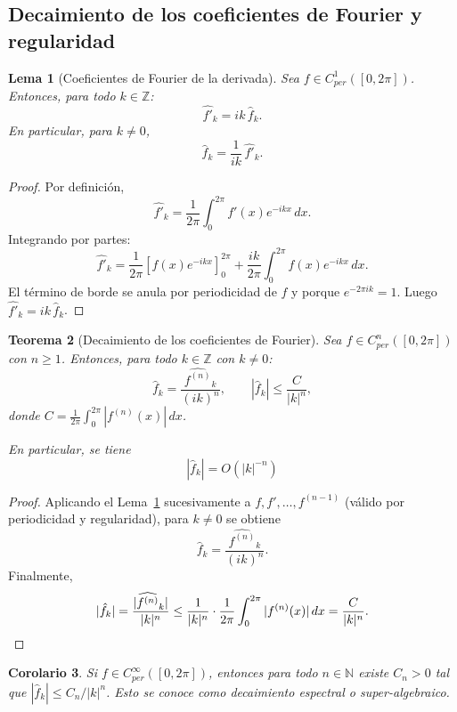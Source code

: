 \documentclass[a4paper,11pt]{report}
\newtheorem{theorem}{Teorema}[chapter]
\newtheorem{lemma}[theorem]{Lema}
\newtheorem{corollary}[theorem]{Corolario}
\begin{document}
\subsection{Decaimiento de los coeficientes de Fourier y regularidad}

\begin{lemma}[Coeficientes de Fourier de la derivada]\label{lem:fourier_derivada_coef}
Sea $f\in C^1_{per}([0,2\pi])$. Entonces, para todo $k\in\mathbb Z$:
\[
\widehat{f'}_k = ik\,\hat f_k.
\]
En particular, para $k\neq 0$,
\begin{equation}\label{fourier_deriv}
\hat f_k = \frac{1}{ik}\,\widehat{f'}_k.
\end{equation}
\end{lemma}

\begin{proof}
Por definición,
\[
\widehat{f'}_k=\frac{1}{2\pi}\int_0^{2\pi}f'(x)e^{-ikx}\,dx.
\]
Integrando por partes:
\[
\widehat{f'}_k
=\frac{1}{2\pi}\left[f(x)e^{-ikx}\right]_0^{2\pi}
+\frac{ik}{2\pi}\int_0^{2\pi}f(x)e^{-ikx}\,dx.
\]
El término de borde se anula por periodicidad de $f$ y porque $e^{-2\pi ik}=1$. Luego
$\widehat{f'}_k=ik\,\hat f_k$.
\end{proof}

\begin{theorem}[Decaimiento de los coeficientes de Fourier]\label{thm:decaimiento_fourier}
Sea $f \in C^n_{per}([0,2\pi])$ con $n \ge 1$. Entonces, para todo $k \in \mathbb{Z}$ con $k \neq 0$:
\[
\hat{f}_k = \frac{\widehat{f^{(n)}}_k}{(ik)^n}, \qquad |\hat{f}_k| \leq \frac{C}{|k|^n},
\]
donde $C = \frac{1}{2\pi}\int_0^{2\pi}|f^{(n)}(x)|\,dx$.

En particular, se tiene 
\[
|\hat f_k|=O(|k|^{-n})
\]
\end{theorem}

\begin{proof}
Aplicando el Lema~\ref{lem:fourier_derivada_coef} sucesivamente a
$f, f',\ldots,f^{(n-1)}$ (válido por periodicidad y regularidad), para $k\neq 0$ se obtiene
\[
\hat{f}_k=\frac{\widehat{f^{(n)}}_k}{(ik)^n}.
\]
Finalmente,
\[
|\hat{f}_k|=\frac{|\widehat{f^{(n)}}_k|}{|k|^n}
\le \frac{1}{|k|^n}\cdot\frac{1}{2\pi}\int_0^{2\pi}|f^{(n)}(x)|\,dx
=\frac{C}{|k|^n}. \qedhere
\]
\end{proof}

\begin{corollary}
Si $f \in C^\infty_{per}([0,2\pi])$, entonces para todo $n \in \mathbb{N}$ existe $C_n > 0$ tal que $|\hat{f}_k| \leq C_n/|k|^n$. Esto se conoce como \textit{decaimiento espectral} o \textit{super-algebraico}.
\end{corollary}
\end{document}
